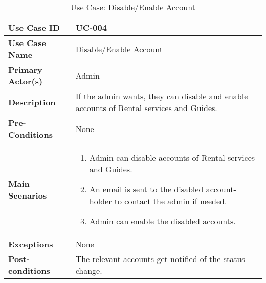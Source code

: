 \begin{table}[ht]
    \centering
    \begin{tabular}{|l|p{}|}
        \hline
        \textbf{Use Case ID} & UC-004 \\
        \hline
        \textbf{Use Case Name} & Disable/Enable Account \\
        \hline
        \textbf{Primary Actor(s)} & Admin \\
        \hline
        \textbf{Description} & If the admin wants, they can disable and enable accounts of Rental services and Guides. \\
        \hline
        \textbf{Pre-Conditions} & None \\
        \hline
        \textbf{Main Scenarios} & 
        \begin{enumerate}[label=\arabic*.,itemsep=0pt]
            \item Admin can disable accounts of Rental services and Guides.
            \item An email is sent to the disabled account-holder to contact the admin if needed.
            \item Admin can enable the disabled accounts.
        \end{enumerate} \\
        \hline
        \textbf{Exceptions} & None \\
        \hline
        \textbf{Post-conditions} & The relevant accounts get notified of the status change. \\
        \hline
    \end{tabular}
    \label{tab:use-case-disable-enable}
     \caption{Use Case: Disable/Enable Account}
\end{table}


